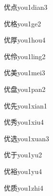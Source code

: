 \begin{verbete}[6;9]{优点}{you1dian3}
\end{verbete}

\begin{verbete}[6;10]{优格}{you1ge2}
\end{verbete}

\begin{verbete}[6;9]{优厚}{you1hou4}
\end{verbete}

\begin{verbete}[6;7]{优伶}{you1ling2}
\end{verbete}

\begin{verbete}[6;9]{优美}{you1mei3}
\end{verbete}

\begin{verbete}[6;11]{优盘}{you1pan2}
\end{verbete}

\begin{verbete}[6;6]{优先}{you1xian1}
\end{verbete}

\begin{verbete}[6;7]{优秀}{you1xiu4}
\end{verbete}

\begin{verbete}[6;9]{优选}{you1xuan3}
\end{verbete}

\begin{verbete}[6;3]{优于}{you1yu2}
\end{verbete}

\begin{verbete}[6;12]{优裕}{you1yu4}
\end{verbete}

\begin{verbete}[6;8]{优质}{you1zhi4}
\end{verbete}

